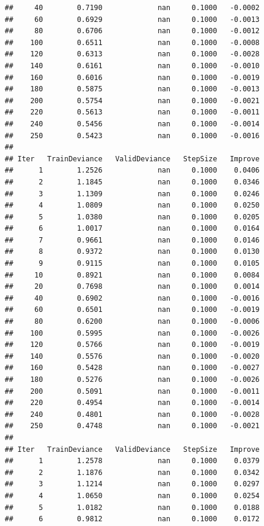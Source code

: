 \documentclass[
]{book}
\begin{document}
\begin{verbatim}
##     40        0.7190             nan     0.1000   -0.0002
##     60        0.6929             nan     0.1000   -0.0013
##     80        0.6706             nan     0.1000   -0.0012
##    100        0.6511             nan     0.1000   -0.0008
##    120        0.6313             nan     0.1000   -0.0028
##    140        0.6161             nan     0.1000   -0.0010
##    160        0.6016             nan     0.1000   -0.0019
##    180        0.5875             nan     0.1000   -0.0013
##    200        0.5754             nan     0.1000   -0.0021
##    220        0.5613             nan     0.1000   -0.0011
##    240        0.5456             nan     0.1000   -0.0014
##    250        0.5423             nan     0.1000   -0.0016
## 
## Iter   TrainDeviance   ValidDeviance   StepSize   Improve
##      1        1.2526             nan     0.1000    0.0406
##      2        1.1845             nan     0.1000    0.0346
##      3        1.1309             nan     0.1000    0.0246
##      4        1.0809             nan     0.1000    0.0250
##      5        1.0380             nan     0.1000    0.0205
##      6        1.0017             nan     0.1000    0.0164
##      7        0.9661             nan     0.1000    0.0146
##      8        0.9372             nan     0.1000    0.0130
##      9        0.9115             nan     0.1000    0.0105
##     10        0.8921             nan     0.1000    0.0084
##     20        0.7698             nan     0.1000    0.0014
##     40        0.6902             nan     0.1000   -0.0016
##     60        0.6501             nan     0.1000   -0.0019
##     80        0.6200             nan     0.1000   -0.0006
##    100        0.5995             nan     0.1000   -0.0026
##    120        0.5766             nan     0.1000   -0.0019
##    140        0.5576             nan     0.1000   -0.0020
##    160        0.5428             nan     0.1000   -0.0027
##    180        0.5276             nan     0.1000   -0.0026
##    200        0.5091             nan     0.1000   -0.0011
##    220        0.4954             nan     0.1000   -0.0014
##    240        0.4801             nan     0.1000   -0.0028
##    250        0.4748             nan     0.1000   -0.0021
## 
## Iter   TrainDeviance   ValidDeviance   StepSize   Improve
##      1        1.2578             nan     0.1000    0.0379
##      2        1.1876             nan     0.1000    0.0342
##      3        1.1214             nan     0.1000    0.0297
##      4        1.0650             nan     0.1000    0.0254
##      5        1.0182             nan     0.1000    0.0188
##      6        0.9812             nan     0.1000    0.0172

\end{verbatim}
\end{document}
